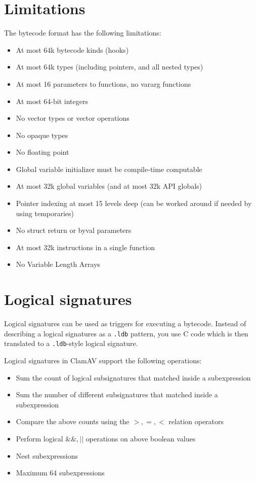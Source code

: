 \section{Limitations}
The bytecode format has the following limitations:
\begin{itemize}
 \item At most 64k bytecode kinds (hooks)
 \item At most 64k types (including pointers, and all nested types)
 \item At most 16 parameters to functions, no vararg functions
 \item At most 64-bit integers
 \item No vector types or vector operations
 \item No opaque types
 \item No floating point
 \item Global variable initializer must be compile-time computable
 \item At most 32k global variables (and at most 32k API globals)
 \item Pointer indexing at most 15 levels deep (can be worked around if needed by using temporaries)
 \item No struct return or byval parameters
 \item At most 32k instructions in a single function
 \item No Variable Length Arrays
\end{itemize}



\section{Logical signatures}
\label{sec:lsigs}
Logical signatures can be used as triggers for executing a bytecode. 
Instead of describing a logical signatures as a \verb+.ldb+ pattern, you use C code which is then
translated to a \verb+.ldb+-style logical signature.

Logical signatures in ClamAV support the following operations:
\begin{itemize}
 \item Sum the count of logical subsignatures that matched inside a subexpression
 \item Sum the number of different subsignatures that matched inside a subexpression
 \item Compare the above counts using the $>,=,<$ relation operators
 \item Perform logical $\&\&, ||$ operations on above boolean values
 \item Nest subexpressions
 \item Maximum 64 subexpressions
\end{itemize}

